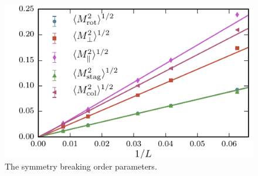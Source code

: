 \documentclass[twocolumn,prb,aps,floatfix,superscriptaddress]{revtex4-1}
\begin{document}
\begin{figure}[]
    \centering
    \includegraphics[width=1.0\linewidth]{order_params_plot.pdf}
    \caption{The symmetry breaking order parameters.}
    \label{fig:order_params}
\end{figure}





\end{document}

